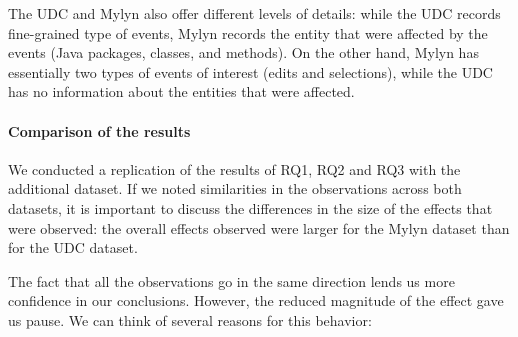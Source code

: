 \documentclass[times]{smrauth}
\begin{document}
The UDC and Mylyn also offer different levels of details: while the UDC records fine-grained type of events, Mylyn records the entity that were affected by the events (Java packages, classes, and methods). On the other hand, Mylyn has essentially two types of events of interest (edits and selections), while the UDC has no information about the entities that were affected.






\paragraph{Comparison of the results}

We conducted a replication of the results of RQ1, RQ2 and RQ3 with the additional dataset. If we noted similarities in the observations across both datasets, it is important to discuss the differences in the size of the effects that were observed: the overall effects observed were larger for the Mylyn dataset than for the UDC dataset.

The fact that all the observations go in the same direction lends us more confidence in our conclusions. However, the reduced magnitude of the effect gave us pause. We can think of several reasons for this behavior:
\end{document}
